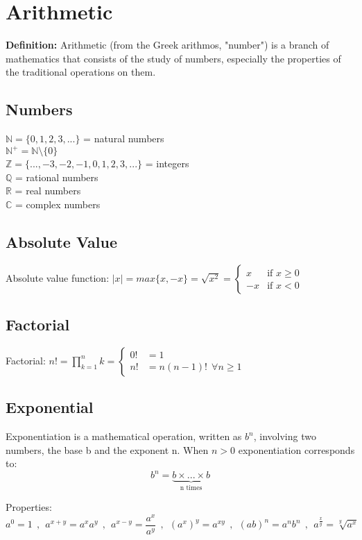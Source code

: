 \chapter{Arithmetic}
\textbf{Definition:} Arithmetic (from the Greek arithmos, "number") is a branch of mathematics that consists of the study of numbers, especially the properties of the traditional operations on them.

\section{Numbers}

$\mathbb{N} = \{0,1,2,3,...\} $ = natural numbers \\
$\mathbb{N^+} = \mathbb{N}\setminus\{0\}$ \\
$\mathbb{Z} = \{...,-3,-2,-1,0,1,2,3,...\} $ = integers \\
$\mathbb{Q}$ = rational numbers \\
$\mathbb{R}$ = real numbers \\
$\mathbb{C}$ = complex numbers

\section{Absolute Value}

Absolute value function: $ \left|x\right| = max\{x,-x\} = \sqrt{x^2} = \begin{cases}
x & \text{if } x\geq0\\
-x & \text{if } x<0
\end{cases} $

\section{Factorial}

Factorial: $ n! = \prod_{k=1}^{n}k  = \begin{cases}
0! &= 1\\
n! &= n(n-1)! \ \ \forall n\ge1
\end{cases} $

\section{Exponential}
Exponentiation is a mathematical operation, written as $b^n$, involving two numbers, the base b and the exponent n. When $n>0$ exponentiation corresponds to: $$b^n=\underbrace{b \times ... \times b}_\text{n times}$$

Properties:
\[
a^0=1 \ \ , \ \ a^{x+y}=a^xa^y \ \ , \ \ a^{x-y}=\frac{a^x}{a^y} \ \ , \ \ (a^x)^y=a^{xy} \ \ , \ \ (ab)^n = a^nb^n \ \ , \ \ a^{\frac{x}{y}}=\sqrt[y]{a^x}
\]

